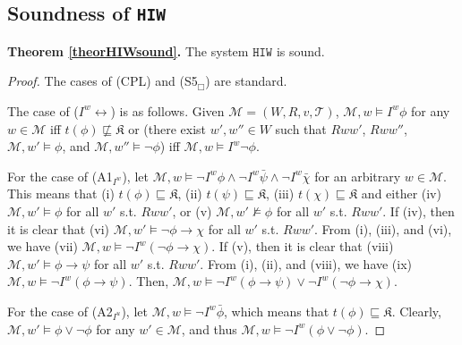 \documentclass{article}
\begin{document}
\subsection{Soundness of \texttt{HIW}}
\label{appHIWsound}

\textbf{Theorem \ref{theorHIWsound}.} The system $\mathtt{HIW}$ is sound.



\begin{proof}

The cases of (CPL) and (S5$_{\Box}$) are standard.

The case of ($I^{w} \leftrightarrow$) is as follows. Given $\mathcal{M} = (W, R, v, \mathcal{T})$, $\mathcal{M}, w \models I^{w} \phi$ for any $w \in \mathcal{M}$ iff $t(\phi) \not \sqsubseteq \mathfrak{K}$ or (there exist $w', w'' \in W$ such that $Rww'$, $Rww''$, $\mathcal{M}, w' \models \phi$, and $\mathcal{M}, w'' \models \neg \phi$) iff $\mathcal{M}, w \models I^{w} \neg \phi$.


For the case of (A1$_{I^{w}}$), let  $\mathcal{M}, w \models \neg I^{w}\phi \wedge \neg I^{w} \bar{\psi} \wedge \neg I^{w} \bar{\chi}$  for an arbitrary $w \in \mathcal{M}$. This means that (i) $t(\phi) \sqsubseteq \mathfrak{K}$, (ii) $t(\psi) \sqsubseteq \mathfrak{K}$, (iii) $t(\chi) \sqsubseteq \mathfrak{K}$ and either (iv) $\mathcal{M}, w' \models \phi$  for all $w'$ s.t. $Rww'$, or (v) $\mathcal{M}, w' \not \models \phi$ for all $w'$ s.t. $Rww'$. If (iv), then it is clear that (vi) $\mathcal{M}, w' \models \neg \phi \rightarrow \chi$  for all $w'$ s.t. $Rww'$. From (i), (iii), and (vi), we have (vii) $\mathcal{M}, w \models \neg I^{w}(\neg \phi \rightarrow \chi)$. If (v), then it is clear that (viii) $\mathcal{M}, w' \models \phi \rightarrow \psi$  for all $w'$ s.t. $Rww'$. From (i), (ii), and (viii), we have (ix) $\mathcal{M}, w \models \neg I^{w}(\phi \rightarrow \psi)$. Then, $\mathcal{M}, w \models \neg I^{w}(\phi \rightarrow \psi) \vee \neg I^{w}(\neg \phi \rightarrow \chi)$.




For the case of (A2$_{I^{u}}$), let $\mathcal{M}, w \models \neg I^{w} \bar{\phi}$, which means that $t(\phi) \sqsubseteq \mathfrak{K}$. Clearly, $\mathcal{M}, w' \models \phi \vee \neg \phi$ for any $w' \in \mathcal{M}$, and thus $\mathcal{M}, w \models \neg I^{w} (\phi \vee \neg \phi)$.




\end{proof}
\end{document}
